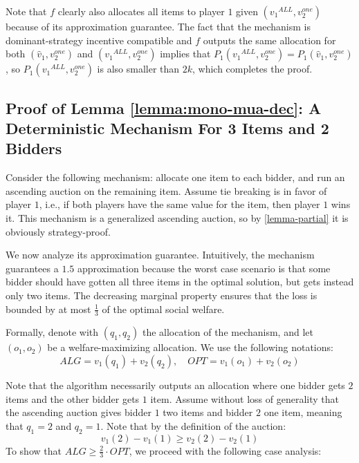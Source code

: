 Note that $f$ clearly also allocates all items to player $1$ given $({v_1}^{ALL},v_2^{one})$ because of its approximation guarantee. The fact that the mechanism is dominant-strategy incentive compatible and $f$ outputs the same allocation for both $(\hat{v}_1,v_2^{one})$ and  $({v_1}^{ALL},v_2^{one})$ implies that $P_1({v_1}^{ALL},v_2^{one})=P_1(\hat{v}_1,v_2^{one})$, so $P_1({v_1}^{ALL},v_2^{one})$ is also smaller than $2k$, which completes the proof. 

\subsection{Proof of Lemma \ref{lemma:mono-mua-dec}: A  Deterministic Mechanism For 3 Items and 2 Bidders}\label{sec-impos-mua-dec}
    Consider the following mechanism: allocate one item to each bidder, and run an ascending auction on the remaining item. Assume tie breaking is in favor of player $1$, i.e., if both players have the same value for the item, then player $1$ wins it.
    This mechanism is a generalized ascending auction, so by \cref{lemma-partial} it is obviously strategy-proof. 
    
    We now analyze its approximation guarantee. 
Intuitively, the mechanism guarantees a $1.5$ approximation because the worst  case scenario is that some bidder  should  have gotten all three items in the optimal solution, but gets instead only two items. The decreasing marginal property ensures that the loss is bounded by at most $\frac{1}{3}$ of the optimal social welfare.



 
    
    Formally, 
denote with $(q_1,q_2)$ the allocation of the mechanism, and let $(o_1,o_2)$ be a welfare-maximizing allocation. We use the following notations: $$ALG=v_1(q_1)+v_2(q_2),\quad OPT=v_1(o_1)+v_2(o_2)$$

    

    Note that the algorithm necessarily outputs an allocation where one bidder gets $2$ items and the other bidder gets $1$ item. Assume without loss of generality that the ascending auction gives bidder $1$ two items and bidder $2$ one item, meaning that  $q_1=2$ and $q_2=1$. Note that by the definition of the auction:
    \begin{equation}\label{eq-opt-ge-alg}
        v_1(2)-v_1(1)\ge v_2(2)-v_2(1) 
    \end{equation}
To show that $ALG \ge \frac{2}{3}\cdot OPT$,  we proceed with the following case analysis:
